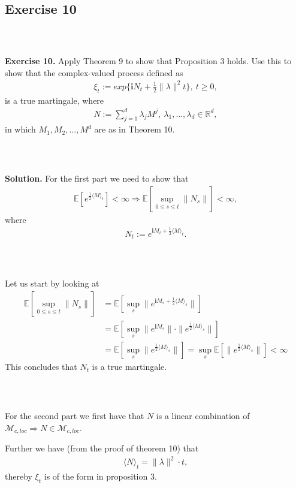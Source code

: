 \documentclass{beamer}
\numberwithin{equation}{section}
\newenvironment{frame2}{\begin{frame}\frametitle{{\normalsize \secname} \\ {\large \subsecname}}}{\end{frame}}
\begin{document}
\subsection{Exercise 10}

\begin{frame2}
    \textbf{Exercise 10.}
    Apply Theorem 9 to show that Proposition 3 holds.
    Use this to show that the complex-valued process defined as
    \begin{align}
        \xi_t := exp\{ \textbf{i}N_t + \frac{1}{2}\| \lambda \|^2 t \}, \ t \geq 0,
    \end{align}
    is a true martingale, where
    \begin{align}
        N := \sum_{j = 1}^d \lambda_j M^j, \ \lambda_1,\ldots,\lambda_d \in \mathbb{R}^d,
    \end{align}
    in which $M_1, M_2, \ldots, M^d$ are as in Theorem 10.
\end{frame2}

\begin{frame2}
    \textbf{Solution.}
    For the first part we need to show that
    \begin{align}
        \mathbb{E}\left[e^{\frac{1}{2}\langle M \rangle_t}\right] < \infty \Rightarrow \mathbb{E}\left[\sup_{0 \leq s \leq t}\| N_s \|\right] < \infty,
    \end{align}
    where
    \begin{align}
        N_t := e^{\textbf{i}M_t + \frac{1}{2}\langle M \rangle_t}.
    \end{align}
\end{frame2}

\begin{frame2}
    Let us start by looking at
    \begin{align}
        \mathbb{E}\left[\sup_{0 \leq s \leq t} \| N_s \| \right] &= \mathbb{E}\left[\sup_s \| e^{\textbf{i}M_s + \frac{1}{2}\langle M \rangle_s} \|\right]\\
        &= \mathbb{E}\left[\sup_s \| e^{\textbf{i}M_s} \| \cdot \|e^{\frac{1}{2}\langle M \rangle_s} \|\right] \\
        &= \mathbb{E}\left[\sup_s \|e^{\frac{1}{2}\langle M \rangle_s}\|\right] = \sup_s \mathbb{E}\left[ \|e^{\frac{1}{2}\langle M \rangle_s} \|\right] < \infty
    \end{align}
    This concludes that $N_t$ is a true martingale. 
\end{frame2}

\begin{frame2}
    For the second part we first have that $N$ is a linear combination of $\mathcal{M}_{c,loc} \Rightarrow N \in \mathcal{M}_{c,loc}$.
    
    \vspace{10pt}
    Further we have (from the proof of theorem 10) that
    \begin{align}
        \langle N \rangle_t = \| \lambda \|^2 \cdot t,
    \end{align}
    thereby $\xi_t$ is of the form in proposition 3.
\end{frame2}
\end{document}
